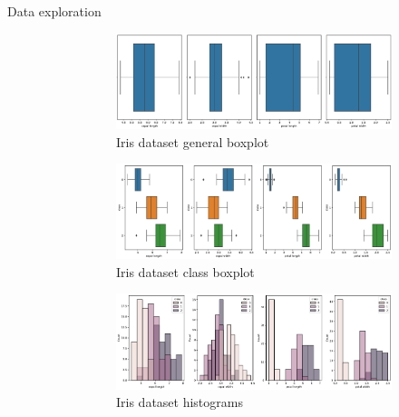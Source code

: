 \begin{description}
    \item[Data exploration] 
        \begin{figure}[ht]
            \begin{subfigure}{.5\textwidth}
                \centering
                \includegraphics[width=\linewidth]{img/_iris_boxplot_general.pdf}
                \caption{Iris dataset general boxplot}
            \end{subfigure}%
            \begin{subfigure}{.5\textwidth}
                \centering
                \includegraphics[width=\linewidth]{img/_iris_boxplot_inside.pdf}
                \caption{Iris dataset class boxplot}
            \end{subfigure}
            \begin{subfigure}{.5\textwidth}
                \centering
                \includegraphics[width=\linewidth]{img/_iris_histogram.pdf}
                \caption{Iris dataset histograms}
            \end{subfigure}%
            \begin{subfigure}{.5\textwidth}

\end{subfigure}
\end{figure}
\end{description}

